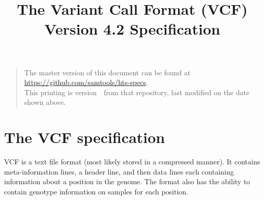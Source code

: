 \documentclass[8pt]{article}
\begin{document}

\title{The Variant Call Format (VCF) Version 4.2 Specification}
\date{\headdate}
\maketitle
\begin{quote}\small
The master version of this document can be found at
\url{https://github.com/samtools/hts-specs}.\\
This printing is version~\commitdesc\ from that repository,
last modified on the date shown above.
\end{quote}
\vspace*{1em}

\section{The VCF specification}
VCF is a text file format (most likely stored in a compressed manner). It contains meta-information lines, a header line, and then data lines each containing information about a position in the genome.
The format also has the ability to contain genotype information on samples for each position.
\end{document}
